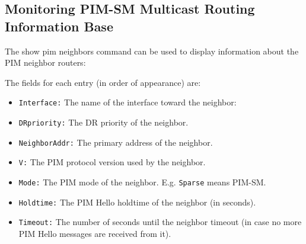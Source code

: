 \subsection{Monitoring PIM-SM Multicast Routing Information Base}

The {\stt show pim neighbors} command can be used to display
information about the PIM neighbor routers:

\vspace{0.1in}
\noindent{}
\vspace{0.1in}

The fields for each entry (in order of appearance) are:
\begin{itemize}

  \item {\tt Interface:} The name of the interface toward the neighbor:

  \item {\tt DRpriority:} The DR priority of the neighbor.

  \item {\tt NeighborAddr:} The primary address of the neighbor.

  \item {\tt V:} The PIM protocol version used by the neighbor.

  \item {\tt Mode:} The PIM mode of the neighbor. E.g. {\tt Sparse} means
  PIM-SM.

  \item {\tt Holdtime:} The PIM Hello holdtime of the neighbor (in seconds).

  \item {\tt Timeout:} The number of seconds until the neighbor timeout (in
  case no more PIM Hello messages are received from it).

\end{itemize}


